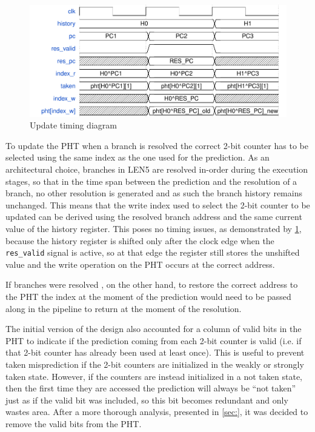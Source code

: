 \begin{figure}[hbt]
  \centering
  \includegraphics[width=.8\textwidth]{img/gshare01.pdf}
  \caption{Update timing diagram}
  \label{fig:gshare01}
\end{figure}
To update the \ac{PHT} when a branch is resolved the correct 2-bit counter has to be selected using the same index as the one used for the prediction. As an architectural choice, branches in LEN5 are resolved in-order during the execution stages, so that in the time span between the prediction and the resolution of a branch, no other resolution is generated and as such the branch history remains unchanged. This means that the write index used to select the 2-bit counter to be updated can be derived using the resolved branch address and the same current value of the history register. This poses no timing issues, as demonstrated by \cref{fig:gshare01}, because the history register is shifted only after the clock edge when the \texttt{res\_valid} signal is active, so at that edge the register still stores the unshifted value and the write operation on the \ac{PHT} occurs at the correct address.

If branches were resolved \ooo, on the other hand, to restore the correct address to the \ac{PHT} the index at the moment of the prediction would need to be passed along in the pipeline to return at the moment of the resolution. 

The initial version of the design also accounted for a column of valid bits in the \ac{PHT} to indicate if the prediction coming from each 2-bit counter is valid (i.e. if that 2-bit counter has already been used at least once). This is useful to prevent taken misprediction if the 2-bit counters are initialized in the weakly or strongly taken state. However, if the counters are instead initialized in a not taken state, then the first time they are accessed the prediction will always be ``not taken'' just as if the valid bit was included, so this bit becomes redundant and only wastes area. After a more thorough analysis, presented in \cref{sec:}, it was decided to remove the valid bits from the \ac{PHT}.

